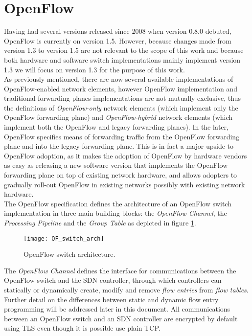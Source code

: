 \section{OpenFlow}
\label{section:openflow}
Having had several versions released since 2008 when version 0.8.0 debuted, OpenFlow is currently on version 1.5\cite{OF15}.
However, because changes made from version 1.3 to version 1.5\cite{OF15}\cite{OF13} are not relevant to the scope of this work and because both hardware and software switch implementations mainly implement version 1.3 we will focus on version 1.3 for the purpose of this work.\\
%
As previously mentioned, there are now several available implementations of OpenFlow-enabled network elements, however OpenFlow implementation and traditional forwarding planes implementations are not mutually exclusive, thus the definitions of \emph{OpenFlow-only} network elements (which implement only the OpenFlow forwarding plane) and \emph{OpenFlow-hybrid} network elements (which implement both the OpenFlow and legacy forwarding planes).
In the later, OpenFlow specifies means of forwarding traffic from the OpenFlow forwarding plane and into the legacy forwarding plane\cite{OF13}.
This is in fact a major upside to OpenFlow adoption, as it makes the adoption of OpenFlow by hardware vendors as easy as releasing a new software version that implements the OpenFlow forwarding plane on top of existing network hardware, and allows adopters to gradually roll-out OpenFlow in existing networks possibly with existing network hardware.\\
%
The OpenFlow specification defines the architecture of an OpenFlow switch implementation in three main building blocks: the \emph{OpenFlow Channel}, the \emph{Processing Pipeline} and the \emph{Group Table} as depicted in figure \ref{fig:OF_switch_arch}.
\begin{figure}
	\centering
	\texttt{[image: OF\_switch\_arch]}
	\caption{OpenFlow switch architecture.}
	\label{fig:OF_switch_arch}
\end{figure}
The \emph{OpenFlow Channel} defines the interface for communications between the OpenFlow switch and the \gls{SDN} controller, through which controllers can statically or dynamically create, modify and remove \emph{flow entries} from \emph{flow tables}.
Further detail on the differences between static and dynamic flow entry programming will be addressed later in this document.
All communications between an OpenFlow switch and an \gls{SDN} controller are encrypted by default using \gls{TLS} even though it is possible use plain \gls{TCP}\cite{OF13}.
